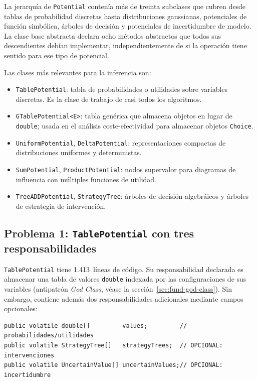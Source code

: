 \documentclass[11pt,a4paper]{article}
\newcommand{\code}[1]{\texttt{#1}}
\begin{document}
La jerarquía de \code{Potential} contenía más de treinta subclases que
cubren desde tablas de probabilidad discretas hasta distribuciones gaussianas,
potenciales de función simbólica, árboles de decisión y potenciales de
incertidumbre de modelo.  La clase base abstracta declara ocho métodos abstractos
que todos sus descendientes debían implementar, independientemente de si la
operación tiene sentido para ese tipo de potencial.

Las clases más relevantes para la inferencia son:

\begin{itemize}
  \item \code{TablePotential}: tabla de probabilidades o utilidades sobre variables
        discretas.  Es la clase de trabajo de casi todos los algoritmos.
  \item \code{GTablePotential<E>}: tabla genérica que almacena objetos en lugar
        de \code{double}; usada en el análisis coste-efectividad para almacenar
        objetos \code{Choice}.
  \item \code{UniformPotential}, \code{DeltaPotential}: representaciones compactas
        de distribuciones uniformes y deterministas.
  \item \code{SumPotential}, \code{ProductPotential}: nodos supervalor para
        diagramas de influencia con múltiples funciones de utilidad.
  \item \code{TreeADDPotential}, \code{StrategyTree}: árboles de decisión
        algebráicos y árboles de estrategia de intervención.
\end{itemize}

\subsection{Problema 1: \code{TablePotential} con tres responsabilidades}
\label{sec:prob1}

\code{TablePotential} tiene 1.413~líneas de código.  Su responsabilidad
declarada es almacenar una tabla de valores \code{double} indexada por las
configuraciones de sus variables (antipatrón \emph{God Class},
véase la sección~\ref{sec:fund-god-class}).  Sin embargo, contiene además dos
responsabilidades adicionales mediante campos opcionales:

\begin{lstlisting}[caption={Campos principales de \code{TablePotential}}]
public volatile double[]         values;         // probabilidades/utilidades
public volatile StrategyTree[]   strategyTrees;  // OPCIONAL: intervenciones
public volatile UncertainValue[] uncertainValues;// OPCIONAL: incertidumbre
\end{lstlisting}
\end{document}
